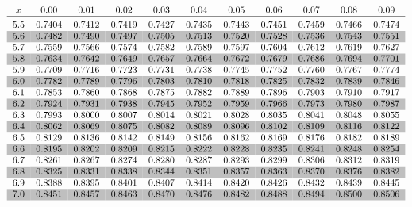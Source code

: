 \documentclass[12pt]{article}
\begin{document}
\begin{equation*}
\begin{tabular}{*{11}{c}}
$x$ & 0.00 & 0.01 & 0.02 & 0.03 & 0.04 & 0.05 & 0.06 & 0.07 & 0.08 & 0.09 \\ \toprule
5.5 & 0.7404 & 0.7412 & 0.7419 & 0.7427 & 0.7435 & 0.7443 & 0.7451 & 0.7459 & 0.7466 & 0.7474 \\
\rowcolor[gray]{0.75}
5.6 & 0.7482 & 0.7490 & 0.7497 & 0.7505 & 0.7513 & 0.7520 & 0.7528 & 0.7536 & 0.7543 & 0.7551 \\
5.7 & 0.7559 & 0.7566 & 0.7574 & 0.7582 & 0.7589 & 0.7597 & 0.7604 & 0.7612 & 0.7619 & 0.7627 \\
\rowcolor[gray]{0.75}
5.8 & 0.7634 & 0.7642 & 0.7649 & 0.7657 & 0.7664 & 0.7672 & 0.7679 & 0.7686 & 0.7694 & 0.7701 \\
5.9 & 0.7709 & 0.7716 & 0.7723 & 0.7731 & 0.7738 & 0.7745 & 0.7752 & 0.7760 & 0.7767 & 0.7774 \\
\rowcolor[gray]{0.75}
6.0 & 0.7782 & 0.7789 & 0.7796 & 0.7803 & 0.7810 & 0.7818 & 0.7825 & 0.7832 & 0.7839 & 0.7846 \\
6.1 & 0.7853 & 0.7860 & 0.7868 & 0.7875 & 0.7882 & 0.7889 & 0.7896 & 0.7903 & 0.7910 & 0.7917 \\
\rowcolor[gray]{0.75}
6.2 & 0.7924 & 0.7931 & 0.7938 & 0.7945 & 0.7952 & 0.7959 & 0.7966 & 0.7973 & 0.7980 & 0.7987 \\
6.3 & 0.7993 & 0.8000 & 0.8007 & 0.8014 & 0.8021 & 0.8028 & 0.8035 & 0.8041 & 0.8048 & 0.8055 \\
\rowcolor[gray]{0.75}
6.4 & 0.8062 & 0.8069 & 0.8075 & 0.8082 & 0.8089 & 0.8096 & 0.8102 & 0.8109 & 0.8116 & 0.8122 \\
6.5 & 0.8129 & 0.8136 & 0.8142 & 0.8149 & 0.8156 & 0.8162 & 0.8169 & 0.8176 & 0.8182 & 0.8189 \\
\rowcolor[gray]{0.75}
6.6 & 0.8195 & 0.8202 & 0.8209 & 0.8215 & 0.8222 & 0.8228 & 0.8235 & 0.8241 & 0.8248 & 0.8254 \\
6.7 & 0.8261 & 0.8267 & 0.8274 & 0.8280 & 0.8287 & 0.8293 & 0.8299 & 0.8306 & 0.8312 & 0.8319 \\
\rowcolor[gray]{0.75}
6.8 & 0.8325 & 0.8331 & 0.8338 & 0.8344 & 0.8351 & 0.8357 & 0.8363 & 0.8370 & 0.8376 & 0.8382 \\
6.9 & 0.8388 & 0.8395 & 0.8401 & 0.8407 & 0.8414 & 0.8420 & 0.8426 & 0.8432 & 0.8439 & 0.8445 \\
\rowcolor[gray]{0.75}
7.0 & 0.8451 & 0.8457 & 0.8463 & 0.8470 & 0.8476 & 0.8482 & 0.8488 & 0.8494 & 0.8500 & 0.8506 \\

\end{tabular}
\end{equation*}
\end{document}
